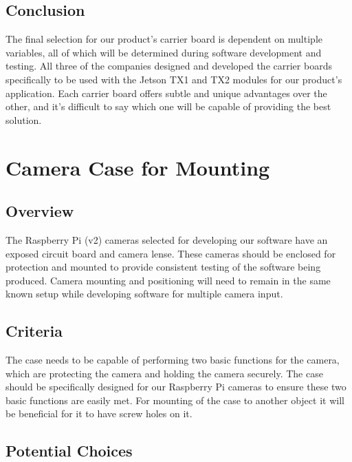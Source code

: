 \documentclass[letterpaper,10pt,serif,draftclsnofoot,onecolumn,compsoc,titlepage]{IEEEtran}
\begin{document}
\subsection{Conclusion}

The final selection for our product's carrier board is dependent on multiple variables, 
all of which will be determined during software development and testing. All three of 
the companies 
designed and developed the carrier boards specifically to be used with the Jetson TX1 and 
TX2 modules for our product's application. Each carrier board offers subtle and unique 
advantages over the other, and it's difficult to say which one will be capable of 
providing the best solution. \\

\section{Camera Case for Mounting}

\subsection{Overview}

The Raspberry Pi (v2) cameras selected for developing our software have an exposed circuit 
board and camera lense. These cameras should be enclosed for protection and mounted to 
provide consistent testing of the software being produced. Camera mounting and positioning
will need to remain in the same known setup while developing software for multiple camera 
input. \\

\subsection{Criteria}

The case needs to be capable of performing two basic functions for the camera, which 
are protecting the camera and holding the camera securely. The case should be specifically 
designed for our Raspberry Pi cameras to ensure these two basic functions are easily 
met. For mounting of the case to another object it will be beneficial for it to 
have screw holes on it. \\

\subsection{Potential Choices}
\end{document}
